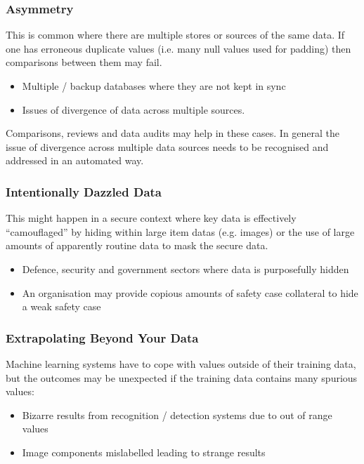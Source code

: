\subsubsection{ Asymmetry}
This is common where there are multiple stores or sources of the same data. If one has erroneous duplicate values (i.e. many null values used for padding) then comparisons between them may fail.
\begin{itemize}
    \item Multiple / backup \glspl{database} where they are not kept in sync
    \item Issues of divergence of data across multiple sources.
\end{itemize}

Comparisons, reviews and data audits may help in these cases. In general the issue of divergence across multiple data sources needs to be recognised and addressed in an automated way.

\subsubsection{Intentionally Dazzled Data}
This might happen in a secure context where key data is effectively ``camouflaged'' by hiding within large \glspl{item data} (e.g. images) or the use of large amounts of apparently routine data to mask the secure data.
\begin{itemize}
    \item Defence, security and government sectors where data is purposefully hidden 
    \item An organisation may provide copious amounts of safety case collateral to hide a weak safety case
\end{itemize}
\subsubsection{Extrapolating Beyond Your Data}
Machine learning systems have to cope with values outside of their training data, but the outcomes may be unexpected if the training data contains many spurious values:
\begin{itemize}
    \item Bizarre results from recognition / detection systems due to out of range values
    \item Image components mislabelled leading to strange results
\end{itemize}

